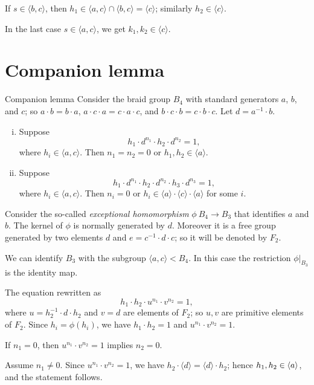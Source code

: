 \documentclass[a4paper,10pt]{article}
\begin{document}
If $s \in \langle b,c\rangle$, then $h_1\in\langle a,c\rangle\cap \langle b,c\rangle=\langle c\rangle$; similarly $h_2\in\langle c\rangle$.

In the last case $s \in \langle a,c\rangle$, we get $k_1,k_2\in\langle c\rangle$.
\qeds

\section{Companion lemma}

\begin{thm}{Companion lemma}\label{lem:companion}
Consider the braid group $B_4$ with standard generators $a$, $b$, and $c$; so $a\cdot b=b\cdot a$, $a\cdot c\cdot a=c\cdot a\cdot c$, and $b\cdot c\cdot b=c\cdot b\cdot c$.
Let $d=a^{-1}\cdot b$.

\begin{enumerate}[(i)]
\item\label{companion2} Suppose
\[h_1\cdot d^{n_1}\cdot h_2 \cdot d^{n_2}=1,\]
where $h_i\in \langle a,c\rangle$.
Then $n_1=n_2=0$ or $h_1,h_2\in\langle a\rangle$.

\item\label{companion3} Suppose
\[h_1\cdot d^{n_1}\cdot h_2 \cdot d^{n_2}\cdot  h_3\cdot  d^{n_3}=1,\]
where $h_i\in \langle a,c\rangle$.
Then $n_i= 0$ or $h_i\in\langle a\rangle\cdot \langle c\rangle\cdot \langle a\rangle$ for some $i$.
\end{enumerate}

\end{thm}

Consider the so-called \emph{exceptional homomorphism} $\phi\:B_4\to B_3$ that identifies $a$ and $b$.
The kernel of $\phi$ is normally generated by $d$.
Moreover it is a free group generated by two elements $d$ and $e=c^{-1}\cdot d\cdot c$; so it will be denoted by $F_2$.

We can identify $B_3$ with the subgroup $\langle a,c\rangle<B_4$.
In this case the restriction $\phi|_{B_3}$ is the identity map.

The equation rewritten as
\[h_1\cdot h_2\cdot u^{n_1}\cdot v^{n_2} =1,\]
where $u=h_2^{-1}\cdot d\cdot h_2$ and $v= d$ are elements of $F_2$;
so $u,v$ are primitive elements of $F_2$.
Since $h_i=\phi(h_i)$, we have $h_1\cdot h_2=1$ and $u^{n_1}\cdot v^{n_2}=1$.


If $n_1=0$, then $u^{n_1}\cdot v^{n_2}=1$ implies $n_2=0$.

Assume $n_1\ne 0$.
Since $u^{n_1}\cdot v^{n_2}=1$, we have $h_2\cdot\langle d\rangle=\langle d\rangle\cdot h_2$;
hence $h_1,h_2\z\in \langle a\rangle$, and the statement follows.
\end{document}
